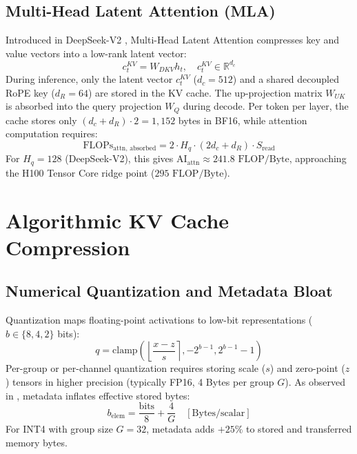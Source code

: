 \documentclass[conference,onecolumn]{IEEEtran}
\begin{document}
\subsection{Multi-Head Latent Attention (MLA)}
Introduced in DeepSeek-V2 \cite{deepseek2024v2}, Multi-Head Latent Attention compresses key and value vectors into a low-rank latent vector:
\begin{equation}
c_t^{KV} = W_{DKV} h_t, \quad c_t^{KV} \in \mathbb{R}^{d_c}
\end{equation}
During inference, only the latent vector $c_t^{KV}$ ($d_c = 512$) and a shared decoupled RoPE key ($d_R = 64$) are stored in the KV cache. The up-projection matrix $W_{UK}$ is absorbed into the query projection $W_Q$ during decode. Per token per layer, the cache stores only $(d_c + d_R) \cdot 2 = 1,152$ bytes in BF16, while attention computation requires:
\begin{equation}
\text{FLOPs}_{\text{attn, absorbed}} = 2 \cdot H_q \cdot (2 d_c + d_R) \cdot S_{\text{read}}
\end{equation}
For $H_q = 128$ (DeepSeek-V2), this gives $\text{AI}_{\text{attn}} \approx 241.8\text{ FLOP/Byte}$, approaching the H100 Tensor Core ridge point ($295\text{ FLOP/Byte}$).

\section{Algorithmic KV Cache Compression}

\subsection{Numerical Quantization and Metadata Bloat}
Quantization maps floating-point activations to low-bit representations ($b \in \{8, 4, 2\}$ bits):
\begin{equation}
q = \text{clamp}\left( \left\lfloor \frac{x - z}{s} \right\rceil, -2^{b-1}, 2^{b-1} - 1 \right)
\end{equation}
Per-group or per-channel quantization requires storing scale ($s$) and zero-point ($z$) tensors in higher precision (typically FP16, 4 Bytes per group $G$). As observed in \cite{zheng2026interface}, metadata inflates effective stored bytes:
\begin{equation}
b_{\text{elem}} = \frac{\text{bits}}{8} + \frac{4}{G} \quad [\text{Bytes/scalar}]
\end{equation}
For INT4 with group size $G = 32$, metadata adds $+25\%$ to stored and transferred memory bytes.
\end{document}
